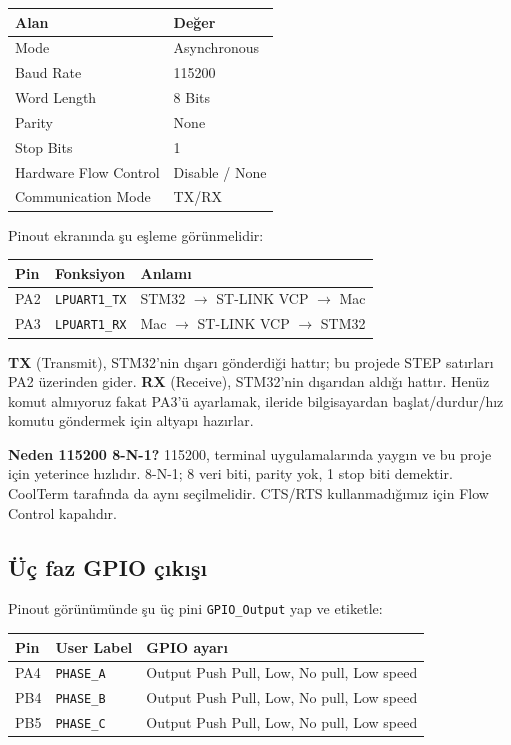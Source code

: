 \documentclass[11pt,a4paper]{article}
\begin{document}
\begin{center}
\begin{tabular}{ll}
\toprule
Alan & Değer \\
\midrule
Mode & Asynchronous \\
Baud Rate & 115200 \\
Word Length & 8 Bits \\
Parity & None \\
Stop Bits & 1 \\
Hardware Flow Control & Disable / None \\
Communication Mode & TX/RX \\
\bottomrule
\end{tabular}
\end{center}

Pinout ekranında şu eşleme görünmelidir:

\begin{center}
\begin{tabular}{lll}
\toprule
Pin & Fonksiyon & Anlamı \\
\midrule
PA2 & \texttt{LPUART1\_TX} & STM32 $\rightarrow$ ST-LINK VCP $\rightarrow$ Mac \\
PA3 & \texttt{LPUART1\_RX} & Mac $\rightarrow$ ST-LINK VCP $\rightarrow$ STM32 \\
\bottomrule
\end{tabular}
\end{center}

\textbf{TX} (Transmit), STM32'nin dışarı gönderdiği hattır; bu projede STEP
satırları PA2 üzerinden gider. \textbf{RX} (Receive), STM32'nin dışarıdan aldığı
hattır. Henüz komut almıyoruz fakat PA3'ü ayarlamak, ileride bilgisayardan
başlat/durdur/hız komutu göndermek için altyapı hazırlar.

\textbf{Neden 115200 8-N-1?} 115200, terminal uygulamalarında yaygın ve bu proje
için yeterince hızlıdır. 8-N-1; 8 veri biti, parity yok, 1 stop biti demektir.
CoolTerm tarafında da aynı seçilmelidir. CTS/RTS kullanmadığımız için Flow Control
kapalıdır.

\subsection{Üç faz GPIO çıkışı}

Pinout görünümünde şu üç pini \texttt{GPIO\_Output} yap ve etiketle:

\begin{center}
\begin{tabular}{lll}
\toprule
Pin & User Label & GPIO ayarı \\
\midrule
PA4 & \texttt{PHASE\_A} & Output Push Pull, Low, No pull, Low speed \\
PB4 & \texttt{PHASE\_B} & Output Push Pull, Low, No pull, Low speed \\
PB5 & \texttt{PHASE\_C} & Output Push Pull, Low, No pull, Low speed \\
\bottomrule
\end{tabular}
\end{center}
\end{document}
